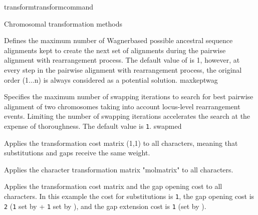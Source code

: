 \begin{command}{transform}{transformcommand}
\begin{arguments}
\begin{argumentgroup}{Chromosomal transformation methods}
\begin{description}
                        {Defines the maximum number of Wagner\-based possible ancestral sequence
                        alignments kept to create the next set of alignments during the pairwise alignment
                        with rearrangement process.  The default value of  is 1,
                        however, at every step in the pairwise alignment with rearrangement process, the original
                        order (1...n) is always considered as a potential solution.}
                        {maxkeptwag}
                        
                        
                        {Specifies the maximum number of swapping iterations
                        to search for best pairwise alignment of two chromosomes
                        taking into account locus-level rearrangement events. Limiting the number of swapping
                        iterations accelerates the search at the expense of
                        thoroughness. The default value is \texttt{1}.}
                        {swapmed}

       
          \end{description}
	\end{argumentgroup}
	\end{arguments}
	


	\begin{poyexamples} 
             	{Applies the transformation cost matrix (1,1) to all characters,
             	meaning that substitutions and gaps receive the same weight.}

           	 {Applies the character transformation matrix "molmatrix" to all
            	characters.}
            	
		
		{Applies the transformation cost matrix and the gap opening cost
		to all characters. In this example the cost for substitutions is \texttt{1},
		the gap opening cost is \texttt{2} (\texttt{1} set by 
		+ \texttt{1} set by ), and the gap extension cost is \texttt{1}
		(set by ).}
		

\end{poyexamples}
\end{command}
